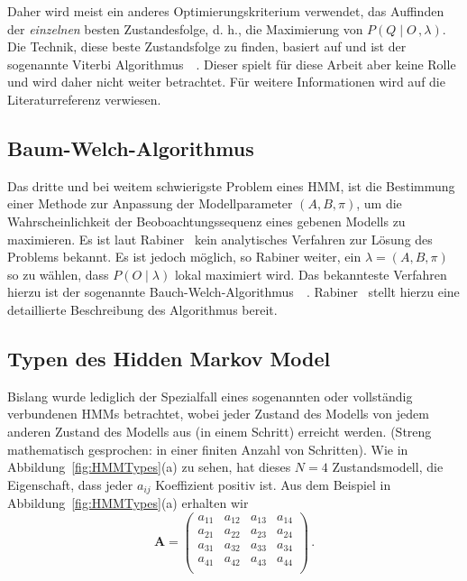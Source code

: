 \newline
Daher wird meist ein anderes Optimierungskriterium verwendet, das Auffinden der \textit{einzelnen} besten Zustandesfolge, d. h., die Maximierung von $P (Q \mid O \, , \lambda)$. Die Technik, diese beste Zustandsfolge zu finden, basiert auf  und ist der sogenannte Viterbi Algorithmus~\cite{bib:viterbi}~\cite{bib:forney}.
\newline
Dieser spielt f\"ur diese Arbeit aber keine Rolle und wird daher nicht weiter betrachtet. F\"ur weitere Informationen wird auf die Literaturreferenz verwiesen.

\subsection{Baum-Welch-Algorithmus}
Das dritte und bei weitem schwierigste Problem eines \gls{HMM}, ist die Bestimmung einer Methode zur Anpassung der Modellparameter $(A, B, \pi)$, um die Wahrscheinlichkeit der Beoboachtungssequenz eines gebenen Modells zu maximieren.
\newline
Es ist laut Rabiner~\cite[S.~264]{bib:hmmrabiner} kein analytisches Verfahren zur L\"osung des Problems bekannt. Es ist jedoch m\"oglich, so Rabiner weiter, ein $\lambda = (A, B, \pi)$ so zu w\"ahlen, dass $P (O \mid \lambda)$ lokal maximiert wird. Das bekannteste Verfahren hierzu ist der sogenannte Bauch-Welch-Algorithmus~\cite{bib:baumFellow}~\cite{bib:baumWelch}.
\newline
Rabiner~\cite[S.~264ff]{bib:hmmrabiner} stellt hierzu eine detaillierte Beschreibung des Algorithmus bereit.

\subsection{Typen des Hidden Markov Model}
Bislang wurde lediglich der Spezialfall eines sogenannten  oder vollst\"andig verbundenen \acrshort{HMM}s betrachtet, wobei jeder Zustand des Modells von jedem anderen Zustand des Modells aus (in einem Schritt) erreicht werden. (Streng mathematisch gesprochen: in einer finiten Anzahl von Schritten). Wie in Abbildung~\ref{fig:HMMTypes}(a) zu sehen, hat dieses $N = 4$ Zustandsmodell, die Eigenschaft, dass jeder $a_{ij}$ Koeffizient positiv ist. Aus dem Beispiel in Abbildung~\ref{fig:HMMTypes}(a) erhalten wir
\begin{equation}
\mathbf{A} = 
\begin{pmatrix}
a_{11} & a_{12} & a_{13} & a_{14} \\
a_{21} & a_{22} & a_{23} & a_{24} \\
a_{31} & a_{32} & a_{33} & a_{34} \\
a_{41} & a_{42} & a_{43} & a_{44} \\
\end{pmatrix} \, .
\end{equation}

